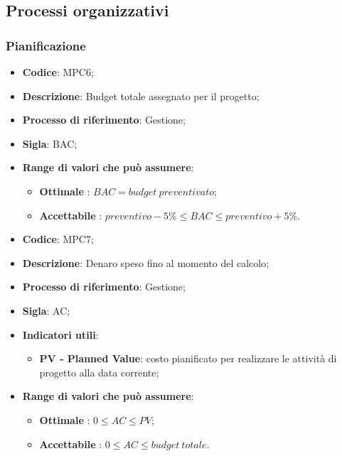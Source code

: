 \subsection{Processi organizzativi}
\subsubsection{Pianificazione}
\vspace{-1cm}
\begin{itemize}
	\item \textbf{Codice}: MPC6;
	\item \textbf{Descrizione}: Budget totale assegnato per il progetto;
	\item \textbf{Processo di riferimento}: Gestione;
	\item \textbf{Sigla}: BAC;
	\item \textbf{Range di valori che può assumere}: 
		\begin{itemize}
			\item \textbf{Ottimale} : $BAC = budget \ preventivato$;
			\item \textbf{Accettabile} : $preventivo - 5 \% \leq BAC \leq preventivo + 5 \%$.
		\end{itemize}
\end{itemize}
\vspace{-1cm}
\begin{itemize}
	\item \textbf{Codice}: MPC7;
	\item \textbf{Descrizione}: Denaro speso fino al momento del calcolo;
	\item \textbf{Processo di riferimento}: Gestione;
	\item \textbf{Sigla}: AC;
	\item \textbf{Indicatori utili}: 
		\begin{itemize}
			\item \textbf{PV - Planned Value}: costo pianificato per realizzare le attività di progetto alla data corrente;
		\end{itemize}
	\item \textbf{Range di valori che può assumere}: 
		\begin{itemize}
			\item \textbf{Ottimale} : $0 \leq AC \leq PV $;
			\item \textbf{Accettabile} : $0 \leq AC \leq budget \ totale $.
		\end{itemize}
\end{itemize}
